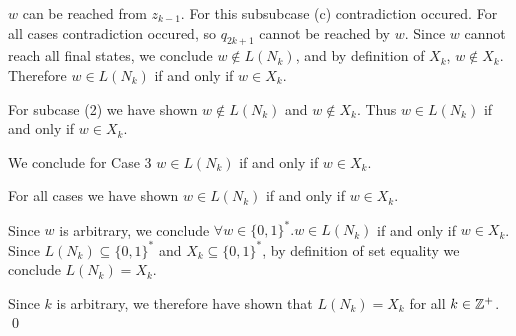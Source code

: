 \documentclass[11pt, sakura, night, 1in]{hw}
\begin{document}
{{\begin{proofcases}
{{{                         $w$ can be reached from $z_{k-1}$.
                        For this subsubcase (c) contradiction occured.
                    }
                    For all cases contradiction occured, so $q_{2k+1}$ cannot be reached by $w$. Since $w$ cannot reach all final states, we conclude $w\notin L(N_k)$, and by definition of $X_k$, $w\notin X_k$. Therefore $w\in L(N_k)$ if and only if $w\in X_k$.
                }
                
                For subcase (2) we have shown $w\notin L(N_k)$ and $w\notin X_k$. Thus $w\in L(N_k)$ if and only if $w\in X_k$.
            }

            We conclude for Case 3 $w\in L(N_k)$ if and only if $w\in X_k$.

        \end{proofcases}

        For all cases we have shown $w\in L(N_k)$ if and only if $w\in X_k$.
    }

    Since $w$ is arbitrary, we conclude $\forall w\in\{0,1\}^*. w\in L(N_k)$ if and only if $w\in X_k$. Since $L(N_k)\subseteq \{0,1\}^*$ and $X_k\subseteq \{0,1\}^*$, by definition of set equality we conclude $L(N_k)=X_k$.
}

Since $k$ is arbitrary, we therefore have shown that $L(N_k)=X_k$ for all $k\in\mathbb{Z}^+$. \qed
\end{document}
